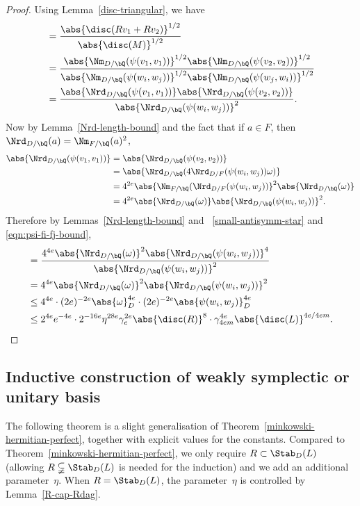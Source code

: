 \begin{proof}
Using Lemma~\ref{disc-triangular}, we have
\begin{align*}
[M : Rv_1 + Rv_2]
& = \frac{\abs{\disc(Rv_1 + Rv_2)}^{1/2}}{\abs{\disc(M)}^{1/2}}
\\& = \frac{\abs{\Nm_{D/\bQ}(\psi(v_1, v_1))}^{1/2} \abs{\Nm_{D/\bQ}(\psi(v_2, v_2))}^{1/2}}{\abs{\Nm_{D/\bQ}(\psi(w_i, w_j))}^{1/2} \abs{\Nm_{D/\bQ}(\psi(w_j, w_i))}^{1/2}}
\\& = \frac{\abs{\Nrd_{D/\bQ}(\psi(v_1, v_1))} \abs{\Nrd_{D/\bQ}(\psi(v_2, v_2))}}{\abs{\Nrd_{D/\bQ}(\psi(w_i, w_j))}^2}.
\end{align*}
Now by Lemma~\ref{Nrd-length-bound} and the fact that if $a \in F$, then $\Nrd_{D/\bQ}(a) = \Nm_{F/\bQ}(a)^2$,
\begin{align*}
\abs{\Nrd_{D/\bQ}(\psi(v_1, v_1))}
& = \abs{\Nrd_{D/\bQ}(\psi(v_2, v_2))}
\\& = \abs{\Nrd_{D/\bQ}(4 \Nrd_{D/F}(\psi(w_i, w_j)) \omega)}
\\& = 4^{2e} \abs{\Nm_{F/\bQ}(\Nrd_{D/F}(\psi(w_i, w_j))}^2 \abs{\Nrd_{D/\bQ}(\omega)}
\\& = 4^{2e} \abs{\Nrd_{D/\bQ}(\omega)} \abs{\Nrd_{D/\bQ}(\psi(w_i, w_j))}^2.
\end{align*}
Therefore by Lemmas~\ref{Nrd-length-bound} and~ \ref{small-antisymm-star} and \eqref{eqn:psi-fi-fj-bound},
\begin{align*}
[M : Rv_1 + Rv_2]
& = \frac{4^{4e} \abs{\Nrd_{D/\bQ}(\omega)}^2 \abs{\Nrd_{D/\bQ}(\psi(w_i, w_j))}^4}{\abs{\Nrd_{D/\bQ}(\psi(w_i, w_j))}^2}
\\& = 4^{4e} \abs{\Nrd_{D/\bQ}(\omega)}^2 \abs{\Nrd_{D/\bQ}(\psi(w_i, w_j))}^2
\\& \leq 4^{4e} \cdot (2e)^{-2e} \abs{\omega}_D^{4e} \cdot (2e)^{-2e} \abs{\psi(w_i, w_j)}_D^{4e}
\\& \leq 2^{4e} e^{-4e} \cdot 2^{-16e} \eta^{28e} \gamma_e^{2e} \abs{\disc(R)}^8 \cdot \gamma_{4em}^{4e} \abs{\disc(L)}^{4e/4em}.
\qedhere
\end{align*}
\end{proof}

\subsection{Inductive construction of weakly symplectic or unitary basis}

The following theorem is a slight generalisation of Theorem~\ref{minkowski-hermitian-perfect}, together with explicit values for the constants.
Compared to Theorem~\ref{minkowski-hermitian-perfect}, we only require $R \subset \Stab_D(L)$ (allowing $R \subsetneqq \Stab_D(L)$ is needed for the induction) and we add an additional parameter~$\eta$.
When $R = \Stab_D(L)$, the parameter~$\eta$ is controlled by Lemma~\ref{R-cap-Rdag}.


